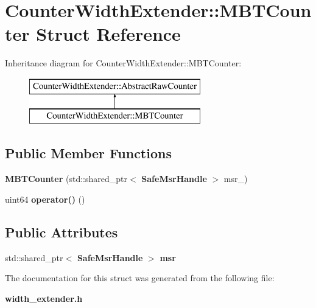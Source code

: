 \section{Counter\+Width\+Extender\+:\+:M\+B\+T\+Counter Struct Reference}
\label{structCounterWidthExtender_1_1MBTCounter}
Inheritance diagram for Counter\+Width\+Extender\+:\+:M\+B\+T\+Counter\+:\begin{figure}[H]
\begin{center}
\leavevmode
\includegraphics[height=2.000000cm]{structCounterWidthExtender_1_1MBTCounter}
\end{center}
\end{figure}
\subsection*{Public Member Functions}
\begin{DoxyCompactItemize}
\item 
{\bfseries M\+B\+T\+Counter} (std\+::shared\+\_\+ptr$<$ {\bf Safe\+Msr\+Handle} $>$ msr\+\_\+)\label{structCounterWidthExtender_1_1MBTCounter_a68bea99ee05808321fb3422831e816e4}

\item 
uint64 {\bfseries operator()} ()\label{structCounterWidthExtender_1_1MBTCounter_a0d2b7e5e23c4a0b02a00d27080a37ae3}

\end{DoxyCompactItemize}
\subsection*{Public Attributes}
\begin{DoxyCompactItemize}
\item 
std\+::shared\+\_\+ptr$<$ {\bf Safe\+Msr\+Handle} $>$ {\bfseries msr}\label{structCounterWidthExtender_1_1MBTCounter_acd71c78ec1b5fd68ccdc6cbdd3713342}

\end{DoxyCompactItemize}


The documentation for this struct was generated from the following file\+:\begin{DoxyCompactItemize}
\item 
{\bf width\+\_\+extender.\+h}\end{DoxyCompactItemize}
